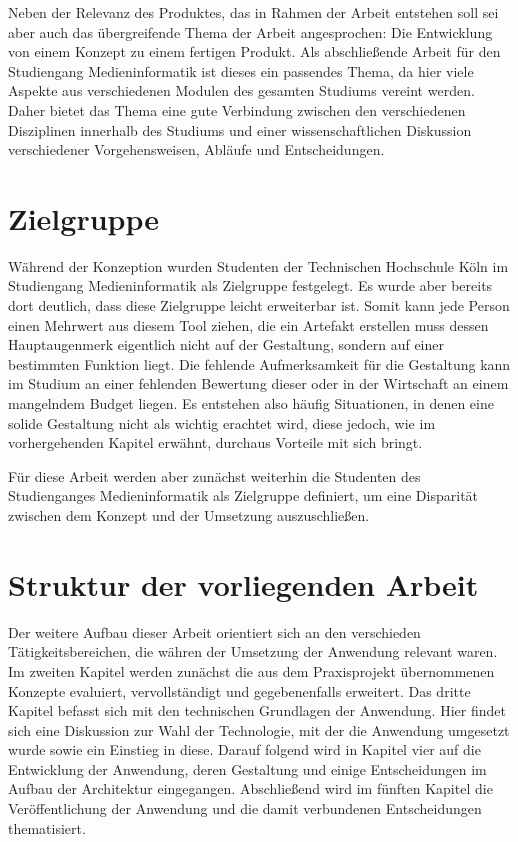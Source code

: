Neben der Relevanz des Produktes, das in Rahmen der Arbeit entstehen soll sei aber auch das übergreifende Thema der Arbeit angesprochen: Die Entwicklung von einem Konzept zu einem fertigen Produkt.
Als abschließende Arbeit für den Studiengang Medieninformatik ist dieses ein passendes Thema, da hier viele Aspekte aus verschiedenen Modulen des gesamten Studiums vereint werden. Daher bietet das Thema eine gute Verbindung zwischen den verschiedenen Disziplinen innerhalb des Studiums und einer wissenschaftlichen Diskussion verschiedener Vorgehensweisen, Abläufe und Entscheidungen.


\section{Zielgruppe}
Während der Konzeption wurden Studenten der Technischen Hochschule Köln im Studiengang Medieninformatik als Zielgruppe festgelegt. Es wurde aber bereits dort deutlich, dass diese Zielgruppe leicht erweiterbar ist. Somit kann jede Person einen Mehrwert aus diesem Tool ziehen, die ein Artefakt erstellen muss dessen Hauptaugenmerk eigentlich nicht auf der Gestaltung, sondern auf einer bestimmten Funktion liegt. Die fehlende Aufmerksamkeit für die Gestaltung kann im Studium an einer fehlenden Bewertung dieser oder in der Wirtschaft an einem mangelndem Budget liegen. Es entstehen also häufig Situationen, in denen eine solide Gestaltung nicht als wichtig erachtet wird, diese jedoch, wie im vorhergehenden Kapitel erwähnt, durchaus Vorteile mit sich bringt.

Für diese Arbeit werden aber zunächst weiterhin die Studenten des Studienganges Medieninformatik als Zielgruppe definiert, um eine Disparität zwischen dem Konzept und der Umsetzung auszuschließen.

\section{Struktur der vorliegenden Arbeit}
Der weitere Aufbau dieser Arbeit orientiert sich an den verschieden Tätigkeitsbereichen, die währen der Umsetzung der Anwendung relevant waren.\\
Im zweiten Kapitel werden zunächst die aus dem Praxisprojekt übernommenen Konzepte evaluiert, vervollständigt und  gegebenenfalls erweitert.
Das dritte Kapitel befasst sich mit den technischen Grundlagen der Anwendung. Hier findet sich eine Diskussion zur Wahl der Technologie, mit der die Anwendung umgesetzt wurde sowie ein Einstieg in diese.
Darauf folgend wird in Kapitel vier auf die Entwicklung der Anwendung, deren Gestaltung und einige Entscheidungen im Aufbau der Architektur eingegangen.
Abschließend wird im fünften Kapitel die Veröffentlichung der Anwendung und die damit verbundenen Entscheidungen thematisiert.

